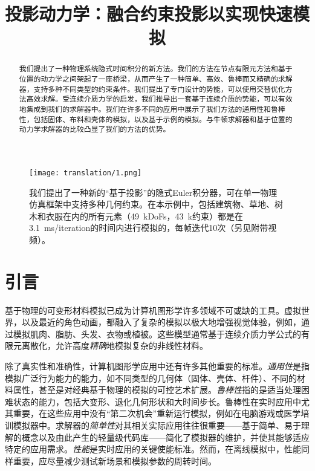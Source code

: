 
\begin{translation}
\label{cha:translation}

\title{投影动力学：融合约束投影以实现快速模拟}
\maketitle

\begin{figure}
  \centering
  \texttt{[image: translation/1.png]}
  \caption{
    我们提出了一种新的“基于投影”的隐式Euler积分器，可在单一物理仿真框架中支持多种几何约束。在本示例中，包括建筑物、草地、树木和衣服在内的所有元素（\SI{49}{k}DoFs，\SI{43}{k}约束）都是在\SI{3.1}{\milli\second/iteration}的时间内进行模拟的，每帧迭代10次（另见附带视频）。
  }
  \label{fig:translation-1}
\end{figure}

\begin{abstract}
  我们提出了一种物理系统隐式时间积分的新方法。我们的方法在节点有限元方法和基于位置的动力学之间架起了一座桥梁，从而产生了一种简单、高效、鲁棒而又精确的求解器，支持多种不同类型的约束条件。我们提出了专门设计的势能，可以使用交替优化方法高效求解。受连续介质力学的启发，我们推导出一套基于连续介质的势能，可以有效地集成到我们的求解器中。我们在许多不同的应用中展示了我们方法的通用性和鲁棒性，包括固体、布料和壳体的模拟，以及基于示例的模拟。与牛顿求解器和基于位置的动力学求解器的比较凸显了我们的方法的优势。
\end{abstract}


\section{引言}

基于物理的可变形材料模拟已成为计算机图形学许多领域不可或缺的工具。虚拟世界，以及最近的角色动画，都融入了复杂的模拟以极大地增强视觉体验，例如，通过模拟肌肉、脂肪、头发、衣物或植被。这些模型通常基于连续介质力学公式的有限元离散化，允许高度\emph{精确}地模拟复杂的非线性材料。

除了真实性和准确性，计算机图形学应用中还有许多其他重要的标准。\emph{通用性}是指模拟广泛行为能力的能力，如不同类型的几何体（固体、壳体、杆件）、不同的材料属性，甚至是对经典基于物理的模拟的可控艺术扩展。\emph{鲁棒性}指的是适当处理困难状态的能力，包括大变形、退化几何形状和大时间步长。鲁棒性在实时应用中尤其重要，在这些应用中没有“第二次机会”重新运行模拟，例如在电脑游戏或医学培训模拟器中。求解器的\emph{简单性}对其相关实际应用往往很重要——基于简单、易于理解的概念以及由此产生的轻量级代码库——简化了模拟器的维护，并使其能够适应特定的应用需求。\emph{性能}是实时应用的关键使能标准。然而，在离线模拟中，性能同样重要，应尽量减少测试新场景和模拟参数的周转时间。


\end{translation}
